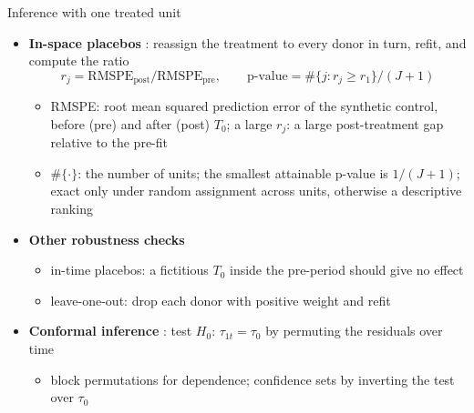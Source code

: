 \begin{frame}{Inference with one treated unit}
\itemsize{\small}
\begin{itemize}
    \item \textbf{In-space placebos} : reassign the treatment to every donor in turn, refit, and compute the ratio \[ r_j = \mathrm{RMSPE}_{\mathrm{post}}/\mathrm{RMSPE}_{\mathrm{pre}}, \qquad \text{p-value} = \#\{j: r_j \ge r_1\}/(J + 1) \]
    \begin{itemize}
        \item RMSPE: root mean squared prediction error of the synthetic control, before (pre) and after (post) $T_0$; a large $r_j$: a large post-treatment gap relative to the pre-fit
        \item $\#\{\cdot\}$: the number of units; the smallest attainable p-value is $1/(J + 1)$; exact only under random assignment across units, otherwise a descriptive ranking 
    \end{itemize}
    \item \textbf{Other robustness checks}
    \begin{itemize}
        \item in-time placebos: a fictitious $T_0$ inside the pre-period should give no effect
        \item leave-one-out: drop each donor with positive weight and refit
    \end{itemize}
    \item \textbf{Conformal inference} : test $H_0$: $\tau_{1t} = \tau_0$ by permuting the residuals over time
    \begin{itemize}
        \item block permutations for dependence; confidence sets by inverting the test over $\tau_0$
    \end{itemize}
\end{itemize}
\end{frame}

